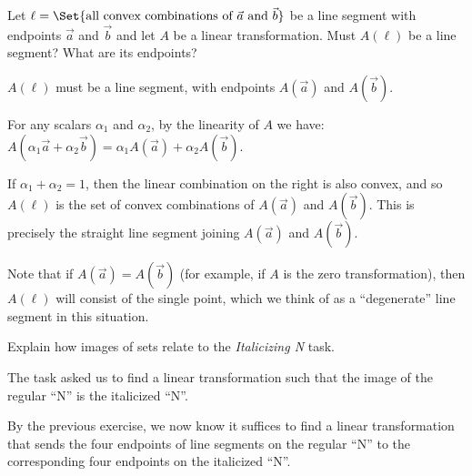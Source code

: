 \documentclass{workbook}
\begin{document}
\begin{slide}
\begin{parts}
\begin{solution}
			\end{solution}
		\item Let $\ell=\Set{\text{all convex combinations of }\vec a\text{ and }\vec b}$
			be a line segment with endpoints $\vec a$ and $\vec b$ and let $A$ be
			a linear transformation. Must $A(\ell)$ be a line segment?
			What are its endpoints?
			\begin{solution}
				$A(\ell)$ must be a line segment, with endpoints $A(\vec a)$ and
				$A(\vec b)$.

				For any scalars $\alpha_1$ and $\alpha_2$, by the linearity of $A$
				we have: $A(\alpha_1\vec a+\alpha_2\vec b)=\alpha_1A(\vec a)+\alpha_2A(\vec b)$.

				If $\alpha_1+\alpha_2=1$, then the linear combination on the right
				is also convex, and so $A(\ell)$ is the set of convex combinations
				of $A(\vec a)$ and $A(\vec b)$.
				This is precisely the straight line segment joining $A(\vec a)$
				and $A(\vec b)$.

				Note that if $A(\vec a)=A(\vec b)$ (for example, if $A$ is the
				zero transformation), then $A(\ell)$ will consist of the single
				point, which we think of as a ``degenerate'' line segment in this
				situation.
			\end{solution}
		\item Explain how images of sets relate to the \emph{Italicizing N} task.
			\begin{solution}
				The task asked us to find a linear transformation such that the
				image of the regular ``N'' is the italicized ``N''.

				By the previous exercise, we now know it suffices to find a
				linear transformation that sends the four endpoints of line
				segments on the regular ``N'' to the corresponding four endpoints
				on the italicized ``N''.
			\end{solution}
	\end{parts}

\end{slide}
	\begin{bookonly}\begin{center}\hspace{-2cm}\triplegrid\end{center}\end{bookonly}
\end{document}
